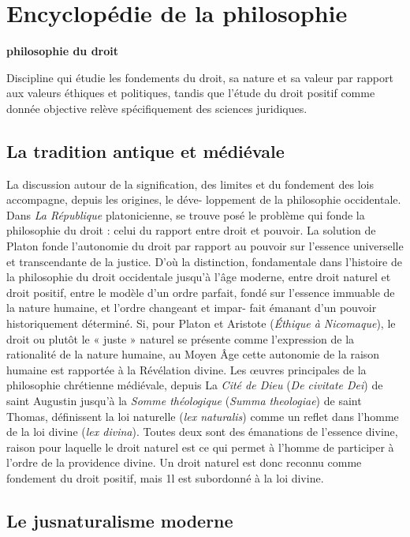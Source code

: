 
\section{Encyclopédie de la philosophie}
%
{\bf philosophie du droit}


\vspace{.7cm}
Discipline qui étudie les fondements du droit, sa nature et
sa valeur par rapport aux valeurs éthiques
et politiques, tandis que l’étude du droit
positif comme donnée objective relève
spécifiquement des sciences juridiques.
%

\subsection{La tradition antique et médiévale}

La discussion autour de la signification,
des limites et du fondement des lois
accompagne, depuis les origines, le déve-
loppement de la philosophie occidentale.
Dans {\it La République} platonicienne, se
trouve posé le problème qui fonde la philosophie du droit : celui du rapport entre
droit et pouvoir. La solution de Platon
fonde l’autonomie du droit par rapport au
pouvoir sur l’essence universelle et transcendante de la justice. D’où la distinction,
fondamentale dans l’histoire de la philosophie du droit occidentale jusqu’à l’âge
moderne, entre droit naturel et droit positif, entre le modèle d’un ordre parfait,
fondé sur l’essence immuable de la nature
humaine, et l’ordre changeant et impar-
fait émanant d’un pouvoir historiquement
déterminé. Si, pour Platon et Aristote
({\it Éthique à Nicomaque}), le droit ou plutôt
le « juste » naturel se présente comme
l’expression de la rationalité de la nature
humaine, au Moyen Âge cette autonomie
de la raison humaine est rapportée à la
Révélation divine. Les œuvres principales
de la philosophie chrétienne médiévale,
depuis La {\it Cité de Dieu} ({\it De civitate Dei})
de saint Augustin jusqu’à la {\it Somme théologique} ({\it Summa theologiae}) de saint
Thomas, définissent la loi naturelle ({\it lex naturalis}) comme un reflet dans l’homme
de la loi divine ({\it lex divina}). Toutes deux
sont des émanations de l’essence divine,
raison pour laquelle le droit naturel est
ce qui permet à l’homme de participer à
l’ordre de la providence divine. Un droit
naturel est donc reconnu comme fondement du droit positif, mais 1l est subordonné à la loi divine.

\subsection{Le jusnaturalisme moderne}


